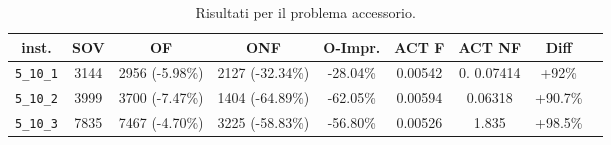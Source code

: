 \begin{table}[h!]
\begin{center}
\small
\begin{tabular}{| c | c | c | c | c | c | c | c | c | }
\hline
inst.			& SOV	& OF				& ONF 				& O-Impr. 	& ACT F 	& ACT NF 		& Diff \\
\hline
\verb|5_10_1|	& 3144  	& 2956	(-5.98\%) 	& 2127 	(-32.34\%)	& -28.04\%	 			& 0.00542 	&  0. 0.07414 	& +92\% \\ 
\verb|5_10_2|	& 3999		& 3700	(-7.47\%)	& 1404	(-64.89\%)	& -62.05\%				& 0.00594	& 0.06318 		& +90.7\%\\
\verb|5_10_3|	& 7835		& 7467	(-4.70\%)	& 3225	(-58.83\%)	& -56.80\%				& 0.00526	& 1.835 		& +98.5\% \\

\hline
\end{tabular}
\caption{Risultati per il problema accessorio.}
\label{table:accessorio:res}
\end{center}
\end{table}
